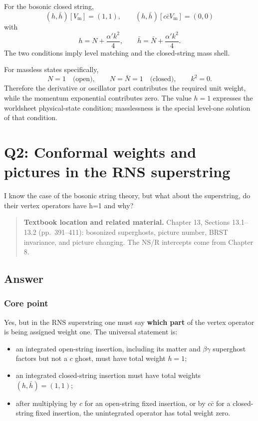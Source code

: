 \documentclass[
  10pt,
  a4paper,
  openany]{book}
\providecommand{\tightlist}{%
  \setlength{\itemsep}{0pt}\setlength{\parskip}{0pt}}
\begin{document}
For the bosonic closed string, \[
\boxed{
(h,\bar h)[V_{\mathrm m}]=(1,1),
\qquad
(h,\bar h)[c\bar cV_{\mathrm m}]=(0,0)
}
\] with \[
h=N+\frac{\alpha'k^2}{4},
\qquad
\bar h=\bar N+\frac{\alpha'k^2}{4}.
\] The two conditions imply level matching and the closed-string mass
shell.

For massless states specifically, \[
N=1
\quad\text{(open)},
\qquad
N=\bar N=1
\quad\text{(closed)},
\qquad
k^2=0.
\] Therefore the derivative or oscillator part contributes the required
unit weight, while the momentum exponential contributes zero. The value
\(h=1\) expresses the worldsheet physical-state condition; masslessness
is the special level-one solution of that condition.

\section{Q2: Conformal weights and pictures in the RNS
superstring}\label{q2-conformal-weights-and-pictures-in-the-rns-superstring}

I know the case of the bosonic string theory, but what about the
superstring, do their vertex operators have h=1 and why?

\begin{quote}
\textbf{Textbook location and related material.} Chapter 13, Sections
13.1--13.2 (pp.~391--411): bosonized superghosts, picture number, BRST
invariance, and picture changing. The NS/R intercepts come from Chapter
8.
\end{quote}

\subsection{Answer}\label{answer-16}

\subsubsection{Core point}\label{core-point-16}

Yes, but in the RNS superstring one must say \textbf{which part} of the
vertex operator is being assigned weight one. The universal statement
is:

\begin{itemize}
\tightlist
\item
  an integrated open-string insertion, including its matter and
  \(\beta\gamma\) superghost factors but not a \(c\) ghost, must have
  total weight \(h=1\);
\item
  an integrated closed-string insertion must have total weights
  \((h,\bar h)=(1,1)\);
\item
  after multiplying by \(c\) for an open-string fixed insertion, or by
  \(c\bar c\) for a closed-string fixed insertion, the unintegrated
  operator has total weight zero.
\end{itemize}
\end{document}
